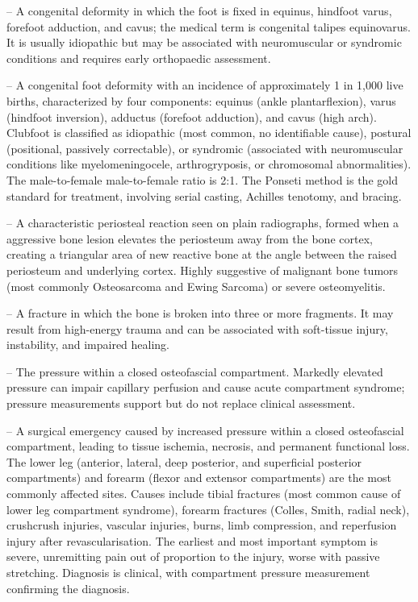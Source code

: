 -- A congenital deformity in which the foot is fixed in equinus, hindfoot varus, forefoot adduction, and cavus; the medical term is congenital talipes equinovarus. It is usually idiopathic but may be associated with neuromuscular or syndromic conditions and requires early orthopaedic assessment.

-- A congenital foot deformity with an incidence of approximately 1 in 1,000 live births, characterized by four components: equinus (ankle plantarflexion), varus (hindfoot inversion), adductus (forefoot adduction), and cavus (high arch). Clubfoot is classified as idiopathic (most common, no identifiable cause), postural (positional, passively correctable), or syndromic (associated with neuromuscular conditions like myelomeningocele, arthrogryposis, or chromosomal abnormalities). The male-to-female male-to-female ratio is 2:1. The Ponseti method is the gold standard for treatment, involving serial casting, Achilles tenotomy, and bracing.

-- A characteristic periosteal reaction seen on plain radiographs, formed when a aggressive bone lesion elevates the periosteum away from the bone cortex, creating a triangular area of new reactive bone at the angle between the raised periosteum and underlying cortex. Highly suggestive of malignant bone tumors (most commonly Osteosarcoma and Ewing Sarcoma) or severe osteomyelitis.

-- A fracture in which the bone is broken into three or more fragments. It may result from high-energy trauma and can be associated with soft-tissue injury, instability, and impaired healing.

-- The pressure within a closed osteofascial compartment. Markedly elevated pressure can impair capillary perfusion and cause acute compartment syndrome; pressure measurements support but do not replace clinical assessment.

-- A surgical emergency caused by increased pressure within a closed osteofascial compartment, leading to tissue ischemia, necrosis, and permanent functional loss. The lower leg (anterior, lateral, deep posterior, and superficial posterior compartments) and forearm (flexor and extensor compartments) are the most commonly affected sites. Causes include tibial fractures (most common cause of lower leg compartment syndrome), forearm fractures (Colles, Smith, radial neck), crushcrush injuries, vascular injuries, burns, limb compression, and reperfusion injury after revascularisation. The earliest and most important symptom is severe, unremitting pain out of proportion to the injury, worse with passive stretching. Diagnosis is clinical, with compartment pressure measurement confirming the diagnosis.

